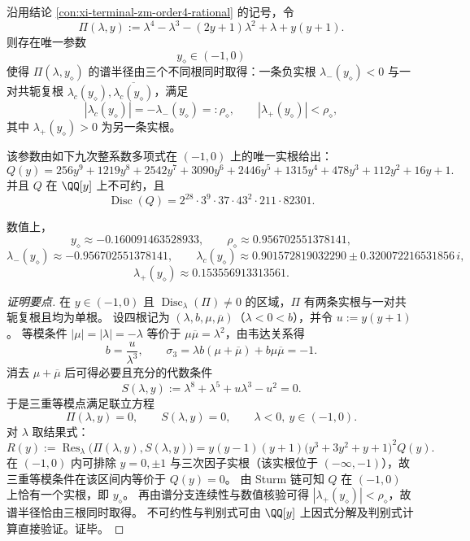 \begin{conclusion}[三重等模点的九次整系数刻画与算术不变量]\label{con:xi-terminal-zm-triple-equimodular-q9}
沿用结论 \ref{con:xi-terminal-zm-order4-rational} 的记号，令
\[
\Pi(\lambda,y):=\lambda^4-\lambda^3-(2y+1)\lambda^2+\lambda+y(y+1).
\]
则存在唯一参数
\[
y_\diamond\in(-1,0)
\]
使得 \(\Pi(\lambda,y_\diamond)\) 的谱半径由三个不同根同时取得：一条负实根 \(\lambda_-(y_\diamond)<0\) 与一对共轭复根 \(\lambda_c(y_\diamond),\overline{\lambda_c(y_\diamond)}\)，满足
\[
|\lambda_c(y_\diamond)|=-\lambda_-(y_\diamond)=:\rho_\diamond,
\qquad
|\lambda_+(y_\diamond)|<\rho_\diamond,
\]
其中 \(\lambda_+(y_\diamond)>0\) 为另一条实根。

该参数由如下九次整系数多项式在 \((-1,0)\) 上的唯一实根给出：
\[
Q(y)=256 y^9 + 1219 y^8 + 2542 y^7 + 3090 y^6 + 2446 y^5 + 1315 y^4 + 478 y^3 + 112 y^2 + 16 y + 1.
\]
并且 \(Q\) 在 \(\QQ[y]\) 上不可约，且
\[
\operatorname{Disc}(Q)=2^{28}\cdot 3^{9}\cdot 37\cdot 43^2\cdot 211\cdot 82301.
\]

数值上，
\[
y_\diamond\approx -0.160091463528933,\qquad
\rho_\diamond\approx 0.956702551378141,
\]
\[
\lambda_-(y_\diamond)\approx-0.956702551378141,\qquad
\lambda_c(y_\diamond)\approx 0.901572819032290\pm 0.320072216531856\,i,
\]
\[
\lambda_+(y_\diamond)\approx 0.153556913313561.
\]
\end{conclusion}
\begin{proof}[证明要点]
在 \(y\in(-1,0)\) 且 \(\operatorname{Disc}_{\lambda}(\Pi)\neq 0\) 的区域，\(\Pi\) 有两条实根与一对共轭复根且均为单根。
设四根记为 \((\lambda,b,\mu,\overline\mu)\)（\(\lambda<0<b\)），并令 \(u:=y(y+1)\)。
等模条件
\(
|\mu|=|\lambda|=-\lambda
\)
等价于 \(\mu\overline\mu=\lambda^2\)，由韦达关系得
\[
b=\frac{u}{\lambda^3},
\qquad
\sigma_3=\lambda b(\mu+\overline\mu)+b\mu\overline\mu=-1.
\]
消去 \(\mu+\overline\mu\) 后可得必要且充分的代数条件
\[
S(\lambda,y):=\lambda^8+\lambda^5+u\lambda^3-u^2=0.
\]
于是三重等模点满足联立方程
\[
\Pi(\lambda,y)=0,\qquad S(\lambda,y)=0,\qquad \lambda<0,\ y\in(-1,0).
\]
对 \(\lambda\) 取结果式：
\[
R(y):=\operatorname{Res}_{\lambda}\bigl(\Pi(\lambda,y),S(\lambda,y)\bigr)
=y(y-1)(y+1)\bigl(y^3+3y^2+y+1\bigr)^2Q(y).
\]
在 \((-1,0)\) 内可排除 \(y=0,\pm 1\) 与三次因子实根（该实根位于 \((- \infty,-1)\)），故三重等模条件在该区间内等价于 \(Q(y)=0\)。
由 Sturm 链可知 \(Q\) 在 \((-1,0)\) 上恰有一个实根，即 \(y_\diamond\)。
再由谱分支连续性与数值核验可得 \(|\lambda_+(y_\diamond)|<\rho_\diamond\)，故谱半径恰由三根同时取得。
不可约性与判别式可由 \(\QQ[y]\) 上因式分解及判别式计算直接验证。证毕。
\end{proof}

